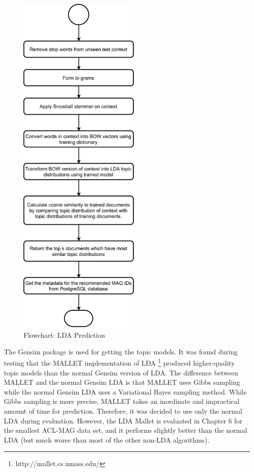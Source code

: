 \begin{figure}
 \centering
 \includegraphics[width=6cm]{figures/Approach/LDAtestingFlowchart.pdf}
  \caption{Flowchart: LDA Prediction}
  \label{fig:ldapredictflowchart}
\end{figure}
The Gensim package is used for getting the topic models. It was found during testing that the MALLET implementation of LDA \footnote{http://mallet.cs.umass.edu/} produced higher-quality topic models than the normal Gensim version of LDA. The difference between MALLET and the normal Gensim LDA is that MALLET uses Gibbs sampling while the normal Gensim LDA uses a Variational Bayes sampling method. While Gibbs sampling is more precise, MALLET takes an inordinate and impractical amount of time for prediction. Therefore, it was decided to use only the normal LDA during evaluation. However, the LDA Mallet is evaluated in Chapter 6 for the smallest ACL-MAG data set, and it performs slightly better than the normal LDA (but much worse than most of the other non-LDA algorithms).\\

